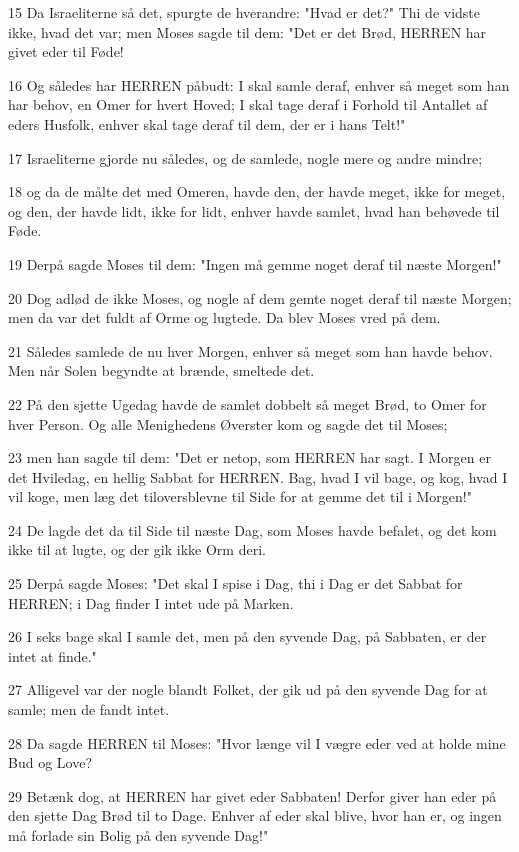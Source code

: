 \par 15 Da Israeliterne så det, spurgte de hverandre: "Hvad er det?" Thi de vidste ikke, hvad det var; men Moses sagde til dem: "Det er det Brød, HERREN har givet eder til Føde!
\par 16 Og således har HERREN påbudt: I skal samle deraf, enhver så meget som han har behov, en Omer for hvert Hoved; I skal tage deraf i Forhold til Antallet af eders Husfolk, enhver skal tage deraf til dem, der er i hans Telt!"
\par 17 Israeliterne gjorde nu således, og de samlede, nogle mere og andre mindre;
\par 18 og da de målte det med Omeren, havde den, der havde meget, ikke for meget, og den, der havde lidt, ikke for lidt, enhver havde samlet, hvad han behøvede til Føde.
\par 19 Derpå sagde Moses til dem: "Ingen må gemme noget deraf til næste Morgen!"
\par 20 Dog adlød de ikke Moses, og nogle af dem gemte noget deraf til næste Morgen; men da var det fuldt af Orme og lugtede. Da blev Moses vred på dem.
\par 21 Således samlede de nu hver Morgen, enhver så meget som han havde behov. Men når Solen begyndte at brænde, smeltede det.
\par 22 På den sjette Ugedag havde de samlet dobbelt så meget Brød, to Omer for hver Person. Og alle Menighedens Øverster kom og sagde det til Moses;
\par 23 men han sagde til dem: "Det er netop, som HERREN har sagt. I Morgen er det Hviledag, en hellig Sabbat for HERREN. Bag, hvad I vil bage, og kog, hvad I vil koge, men læg det tiloversblevne til Side for at gemme det til i Morgen!"
\par 24 De lagde det da til Side til næste Dag, som Moses havde befalet, og det kom ikke til at lugte, og der gik ikke Orm deri.
\par 25 Derpå sagde Moses: "Det skal I spise i Dag, thi i Dag er det Sabbat for HERREN; i Dag finder I intet ude på Marken.
\par 26 I seks bage skal I samle det, men på den syvende Dag, på Sabbaten, er der intet at finde."
\par 27 Alligevel var der nogle blandt Folket, der gik ud på den syvende Dag for at samle; men de fandt intet.
\par 28 Da sagde HERREN til Moses: "Hvor længe vil I vægre eder ved at holde mine Bud og Love?
\par 29 Betænk dog, at HERREN har givet eder Sabbaten! Derfor giver han eder på den sjette Dag Brød til to Dage. Enhver af eder skal blive, hvor han er, og ingen må forlade sin Bolig på den syvende Dag!"
